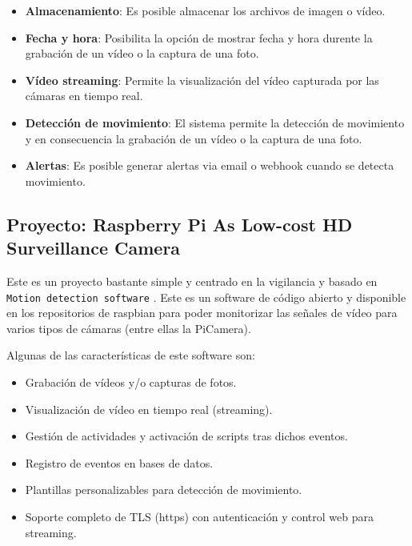 \begin{itemize}
\item \textbf{Almacenamiento}: Es posible almacenar los archivos de imagen o vídeo.

\item \textbf{Fecha y hora}: Posibilita la opción de mostrar fecha y hora durente la grabación de un vídeo o la captura de una foto.

\item \textbf{Vídeo streaming}: Permite la visualización del vídeo capturada por las cámaras en tiempo real.

\item \textbf{Detección de movimiento}: El sistema permite la detección de movimiento y en consecuencia la grabación de un vídeo o la captura de una foto.

\item \textbf{Alertas}: Es posible generar alertas via email o webhook cuando se detecta movimiento.

\end{itemize}

\subsection{Proyecto: Raspberry Pi As Low-cost HD Surveillance Camera}\label{sec:pj2}

Este es un proyecto \cite{ref4} bastante simple y centrado en la vigilancia y basado en \texttt{Motion detection software} \cite{ref5}. Este es un software de código abierto y disponible en los repositorios de raspbian para poder monitorizar las señales de vídeo para varios tipos de cámaras (entre ellas la PiCamera).

Algunas de las características de este software son:

\vspace{-0.5cm}

\begin{itemize}
\item Grabación de vídeos y/o capturas de fotos.
\item Visualización de vídeo en tiempo real (streaming).
\item Gestión de actividades y activación de scripts tras dichos eventos.
\item Registro de eventos en bases de datos.
\item Plantillas personalizables para detección de movimiento.
\item Soporte completo de TLS (https) con autenticación y control web para streaming.

\end{itemize}

